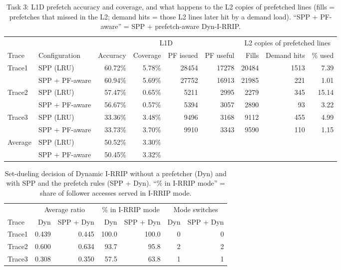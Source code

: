 \documentclass[11pt]{article}
\begin{document}
\begin{table}[H]
\centering
\small
\setlength{\tabcolsep}{4pt}
\begin{tabular}{ll rrrr rrr}
\toprule
& & \multicolumn{4}{c}{L1D} & \multicolumn{3}{c}{L2 copies of prefetched lines}\\
\cmidrule(lr){3-6}\cmidrule(lr){7-9}
Trace & Configuration & Accuracy & Coverage & PF issued & PF useful & Fills & Demand hits & \% used\\
\midrule
Trace1 & SPP (LRU)       & 60.72\% & 5.78\% & 28454 & 17278 & 20484 & 1513 &  7.39\\
       & SPP + PF-aware  & 60.94\% & 5.69\% & 27752 & 16913 & 21985 &  221 &  1.01\\
\midrule
Trace2 & SPP (LRU)       & 57.47\% & 0.65\% &  5211 &  2995 &  2279 &  345 & 15.14\\
       & SPP + PF-aware  & 56.67\% & 0.57\% &  5394 &  3057 &  2890 &   93 &  3.22\\
\midrule
Trace3 & SPP (LRU)       & 33.36\% & 3.48\% &  9496 &  3168 &  9112 &  455 &  4.99\\
       & SPP + PF-aware  & 33.73\% & 3.70\% &  9910 &  3343 &  9590 &  110 &  1.15\\
\midrule
Average & SPP (LRU)      & 50.52\% & 3.30\% & & & & & \\
        & SPP + PF-aware & 50.45\% & 3.32\% & & & & & \\
\bottomrule
\end{tabular}
\caption{Task 3: L1D prefetch accuracy and coverage, and what happens to the
L2 copies of prefetched lines (fills = prefetches that missed in the L2;
demand hits = those L2 lines later hit by a demand load). ``SPP + PF-aware'' =
SPP + prefetch-aware Dyn-I-RRIP.}
\label{tab:t3-pf}
\end{table}

\begin{table}[H]
\centering
\small
\begin{tabular}{l rr rr rr}
\toprule
& \multicolumn{2}{c}{Average ratio} & \multicolumn{2}{c}{\% in I-RRIP mode} & \multicolumn{2}{c}{Mode switches}\\
\cmidrule(lr){2-3}\cmidrule(lr){4-5}\cmidrule(lr){6-7}
Trace & Dyn & SPP + Dyn & Dyn & SPP + Dyn & Dyn & SPP + Dyn\\
\midrule
Trace1 & 0.439 & 0.445 & 100.0 & 100.0 & 0 & 0\\
Trace2 & 0.600 & 0.634 &  93.7 &  95.8 & 2 & 2\\
Trace3 & 0.308 & 0.350 &  57.5 &  63.8 & 1 & 1\\
\bottomrule
\end{tabular}
\caption{Set-dueling decision of Dynamic I-RRIP without a prefetcher (Dyn) and with SPP and the prefetch rules (SPP + Dyn). ``\% in I-RRIP mode'' = share of follower accesses served in I-RRIP mode.}
\label{tab:t3-duel}
\end{table}
\end{document}
